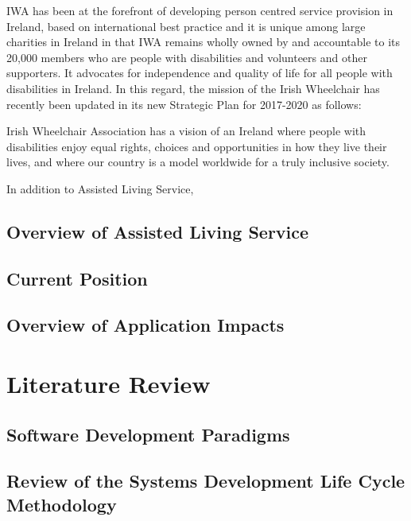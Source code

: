 \documentclass[a4paper,12pt]{article}
\begin{document}
IWA has been at the forefront of developing person centred  service provision in Ireland, based on international best practice and it is unique among large charities in Ireland in that IWA remains wholly owned by and accountable to its 20,000 members who are people with disabilities and volunteers and other supporters. It advocates for independence and quality of life for all people with disabilities in Ireland. In this regard, the mission of the Irish Wheelchair has recently been updated in its new Strategic Plan for 2017-2020 as follows:
\begin{displayquote}
Irish Wheelchair Association  has a vision of an Ireland where people with disabilities enjoy equal rights, choices and opportunities in how they live their lives, and where our country is a model worldwide for a truly inclusive society.
\end{displayquote}

In addition to Assisted Living Service,


\subsection {Overview of Assisted Living Service}
\subsection {Current Position}
\subsection {Overview of Application Impacts}

\section {Literature Review}
\subsection {Software Development Paradigms}
\subsection {Review of the Systems Development Life Cycle Methodology}
\end{document}
